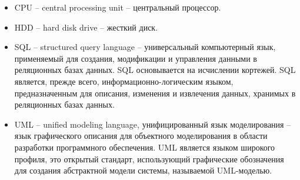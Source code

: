 \begin{itemize}
\item CPU -- central processing unit -- центральный процессор.
\item HDD -- hard disk drive -- жесткий диск.
\item SQL -- structured query language -- универсальный компьютерный язык, применяемый для создания, модификации и управления данными в реляционных базах данных. SQL основывается на исчислении кортежей. SQL является, прежде всего, информационно-логическим языком, предназначенным для описания, изменения и извлечения данных, хранимых в реляционных базах данных. 
\item UML -- unified modeling language, унифицированный язык моделирования -- язык графического описания для объектного моделирования в области разработки программного обеспечения. UML является языком широкого профиля, это открытый стандарт, использующий графические обозначения для создания абстрактной модели системы, называемой UML-моделью.
\end{itemize}